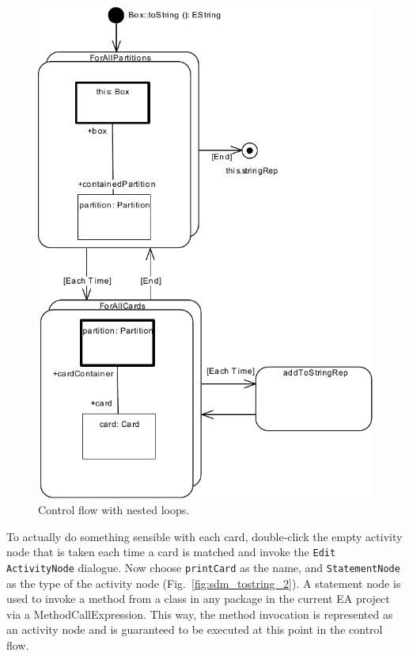 \begin{figure}[htbp]
\begin{center}
  \includegraphics[width=\textwidth]{pics/sdmBilder/toString/sdm72}
  \caption{Control flow with nested loops.}  
  \label{fig:sdm_tostring_1}
\end{center}
\end{figure}

To actually do something sensible with each card, double-click the empty
activity node that is taken each time a card is matched and invoke the \texttt{Edit
ActivityNode} dialogue.  Now choose \texttt{printCard} as
the name, and \texttt{StatementNode} as the type of the activity node
(Fig.~\ref{fig:sdm_tostring_2}).
A statement node is used to invoke a method from a class in any package in the
current EA project via a MethodCallExpression.  This way, the method invocation
is represented as an activity node and is guaranteed to be executed at this
point in the control flow. 

